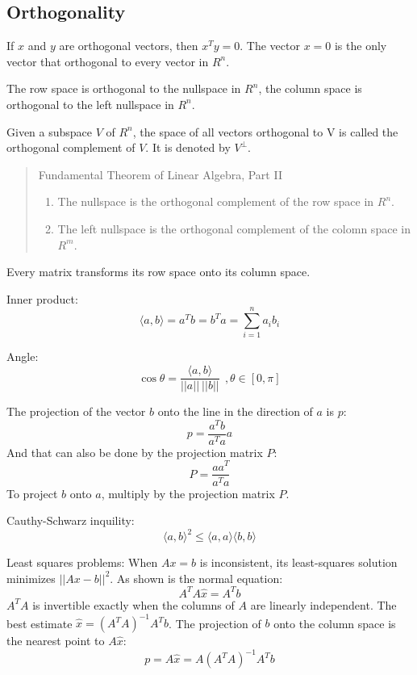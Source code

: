 
 \subsection{Orthogonality}

 If $x$ and $y$ are orthogonal vectors, then $x^T y=0$. The vector $x=0$ is
 the only vector that orthogonal to every vector in $R^n$.

 The row space is orthogonal to the nullspace in $R^n$, the column space
 is orthogonal to the left nullspace in $R^n$.

 Given a subspace $V$ of $R^n$, the space of all vectors orthogonal to V
 is called the orthogonal complement of $V$. It is denoted by $V^\perp$.

\begin{quote}
Fundamental Theorem of Linear Algebra, Part II
	\begin{enumerate}
		\item The nullspace is the orthogonal complement of the row space
			in $R^n$.
		\item The left nullspace is the orthogonal complement of the colomn
			space in $R^m$.
	\end{enumerate}
\end{quote}

 Every matrix transforms its row space onto its column space.

 Inner product:
 $$ \langle a,b \rangle = a^T b = b^T a = \sum_{i=1}^n a_i b_i $$

 Angle:
 $$ \cos\theta = \frac{\langle a,b \rangle}{||a||~||b||} ~~, \theta \in [0,\pi] $$

 The projection of the vector $b$ onto the line in the direction of $a$ is $p$:
 $$p = \frac{a^T b}{a^T a} a$$
 And that can also be done by the projection matrix $P$:
 $$P = \frac{a a^T}{a^T a}$$
 To project $b$ onto $a$, multiply by the projection matrix $P$.

 Cauthy-Schwarz inquility:
 $$ \langle a,b\rangle^2 \leqslant \langle a,a \rangle \langle b,b \rangle $$

 Least squares problems: When $Ax=b$ is inconsistent, its least-squares solution
 minimizes $||Ax-b||^2$. As shown is the normal equation:
 $$A^TA \hat{x} = A^Tb$$
 $A^TA$ is invertible exactly when the columns of $A$ are linearly independent.
 The best estimate $\hat{x} = (A^TA)^{-1}A^Tb$. The projection of $b$ onto the
 column space is the nearest point to $A\hat{x}$:
 $$p = A\hat{x} = A(A^TA)^{-1}A^Tb$$

